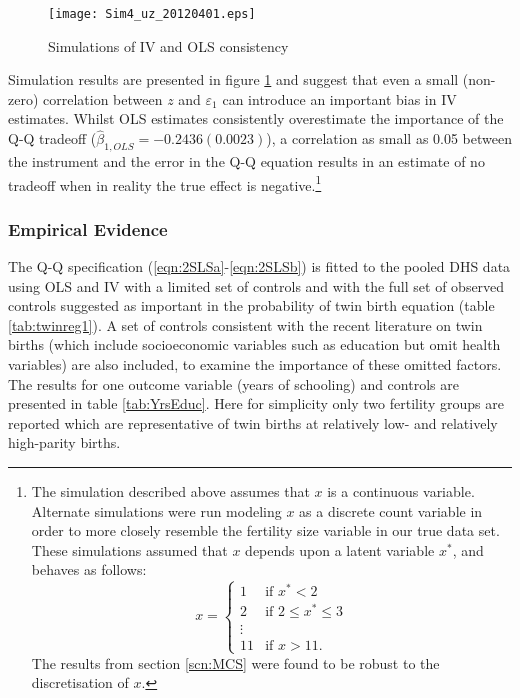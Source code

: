 \documentclass{article}[11pt,subeqn]
\begin{document}
\begin{spacing}{1.5}
\begin{figure}[!htbp]
\caption{Simulations of IV and OLS consistency}
\label{fig:MC}
\begin{center}
\vspace{-4mm}
\texttt{[image: Sim4\_uz\_20120401.eps]}
\end{center}
\end{figure}


Simulation results are presented in figure \ref{fig:MC} and suggest that even a small (non-zero) correlation between $z$ and $\varepsilon_1$ can introduce an 
important bias in IV estimates.  Whilst OLS estimates consistently overestimate the importance of the Q-Q tradeoff ($\hat{\beta}_{1,OLS}=-0.2436 (0.0023)$), a correlation
as small as 0.05 between the instrument and the error in the Q-Q equation results in an estimate of no tradeoff when in reality the true effect is negative.\footnote{The
simulation described above assumes that $x$ is a continuous variable.  Alternate simulations were run modeling $x$ as a discrete count variable in order to more closely resemble the fertility size variable in our true data set.  These simulations assumed that $x$ depends upon a latent variable $x^*$, and behaves as follows:
\[ x = \left\{ \begin{array}{ll}
         1 & \mbox{if $x^* < 2$}\\
         2 & \mbox{if $2\leq x^* \leq 3$}\\
        \vdots & \\
        11 & \mbox{if $x > 11$}.\end{array} \right. \]
 The results from section \ref{scn:MCS} were found to be robust to the discretisation of $x$.
}
\vspace{-5mm}
\subsubsection{Empirical Evidence}
\label{scn:EE}
\vspace{-5mm}
The Q-Q specification (\ref{eqn:2SLSa}-\ref{eqn:2SLSb}) is fitted to the pooled DHS data using OLS and IV with a limited set of controls and with the full set of observed 
controls suggested as important in the probability of twin birth equation (table \ref{tab:twinreg1}).  A set of controls consistent with the recent literature on twin births (which 
include socioeconomic variables such as education but omit health variables) are also included, to examine the importance of these omitted factors.  The results for one outcome variable (years of schooling) and controls are presented in table \ref{tab:YrsEduc}.  Here for simplicity only two fertility groups are reported which are representative
of twin births at relatively low- and relatively high-parity births.



\end{spacing}
\end{document}
